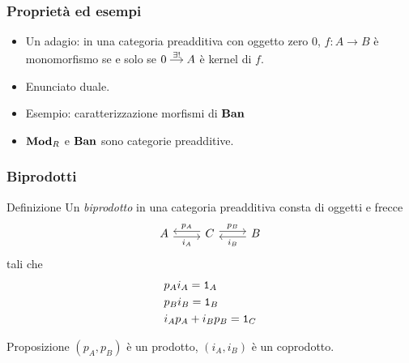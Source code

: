 \documentclass{beamer}
\begin{document}
\begin{frame}[fragile]
  \frametitle{Proprietà ed esempi}
  \begin{itemize}
  \item Un adagio: in una categoria preadditiva con oggetto zero \(0\),
    \(f : A \to B\) è monomorfismo se e solo se
    \(\begin{tikzcd}[column sep=small, cramped] 0 \ar["{\exists!}", r] &
      A \end{tikzcd}\) è kernel di \(f\).
  \item Enunciato duale.
  \item Esempio: caratterizzazione morfismi di \(\mathbf{Ban}\)
  \item \(\mathbf{Mod}_R\) e \(\mathbf{Ban}\) sono categorie preadditive.
  \end{itemize}

\end{frame}

\begin{frame}[fragile]
  \frametitle{Biprodotti}
  
  \begin{block}{Definizione}
    Un {\em biprodotto} in una categoria preadditiva consta di oggetti e
    frecce
    \[
      \begin{tikzcd}
        A \ar["{i_A}", r, shift right, swap] & C \ar["{p_A}", l, shift
        right, swap] \ar["{p_B}", r, shift left] & B \ar["{i_B}", l,
        shift left]
      \end{tikzcd}
    \]
    tali che
    \begin{align}
      & p_A i_A = \mathtt 1_A \label{eqn:Biprod1} \\
      & p_B i_B = \mathtt 1_B \label{eqn:Biprod2}\\
      & i_A p_A + i_B p_B = \mathtt 1_C \label{eqn:Biprod3}
    \end{align}
  \end{block}

  \begin{block}{Proposizione}
    \((p_A, p_B)\) è un prodotto, \((i_A, i_B)\) è un coprodotto.
  \end{block}
  
\end{frame}
\end{document}
